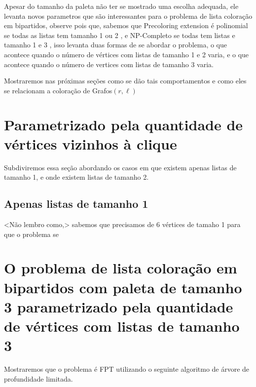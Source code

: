 Apesar do tamanho da paleta não ter se mostrado uma escolha adequada, ele levanta novos parametros que são interessantes para o problema de lista coloração em bipartidos, observe pois que, sabemos que Precoloring extension é polinomial se todas as listas tem tamanho 1 ou 2 \cite{hujter93}, e NP-Completo se todas tem listas e tamanho 1 e 3 \cite{kratochvil94}, isso levanta duas formas de se abordar o problema, o que acontece quando o número de vértices com listas de tamanho 1 e 2 varia, e o que acontece quando o número de vertices com listas de tamanho 3 varia.

Mostraremos nas próximas seções como se dão tais comportamentos e como eles se relacionam a coloração de Grafos$(r,\ell)$

\section{Parametrizado pela quantidade de vértices vizinhos à clique}
Subdiviremos essa seção abordando os casos em que existem apenas listas de tamanho 1, e onde existem listas de tamanho 2.
\subsection{Apenas listas de tamanho 1}
<Não lembro como,> sabemos que precisamos de 6 vértices de tamaho 1 para que o problema se 
\section{O problema de lista coloração em bipartidos com paleta de tamanho 3 parametrizado pela quantidade de vértices com listas de tamanho 3}
Mostraremos que o problema é FPT utilizando o seguinte algoritmo de árvore de profundidade limitada.
